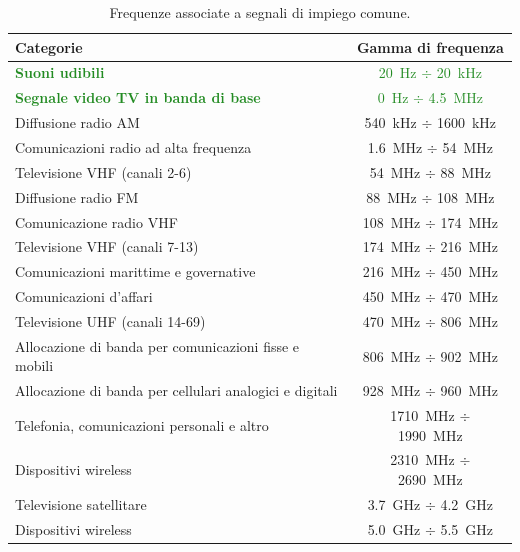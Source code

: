 \documentclass[openany,a4paper,12pt]{book}
\begin{document}
\begin{table}[H]
    \centering
    \small
    \renewcommand{\arraystretch}{1.1}
    \begin{tabular}{lc}
        \toprule
        \textbf{Categorie} & \textbf{Gamma di frequenza} \\
        \midrule
        \rowcolor{ForestGreen!10} \textcolor{ForestGreen}{\textbf{Suoni udibili}} & \textcolor{ForestGreen}{\qty{20}{\hertz} $\div$ \qty{20}{\kilo\hertz}} \\
        \rowcolor{ForestGreen!10} \textcolor{ForestGreen}{\textbf{Segnale video TV in banda di base}} & \textcolor{ForestGreen}{\qty{0}{\hertz} $\div$ \qty{4.5}{\mega\hertz}} \\
        Diffusione radio AM & \qty{540}{\kilo\hertz} $\div$ \qty{1600}{\kilo\hertz} \\
        Comunicazioni radio ad alta frequenza & \qty{1.6}{\mega\hertz} $\div$ \qty{54}{\mega\hertz} \\
        Televisione VHF (canali 2-6) & \qty{54}{\mega\hertz} $\div$ \qty{88}{\mega\hertz} \\
        \midrule
        Diffusione radio FM & \qty{88}{\mega\hertz} $\div$ \qty{108}{\mega\hertz} \\
        Comunicazione radio VHF & \qty{108}{\mega\hertz} $\div$ \qty{174}{\mega\hertz} \\
        Televisione VHF (canali 7-13) & \qty{174}{\mega\hertz} $\div$ \qty{216}{\mega\hertz} \\
        \midrule
        Comunicazioni marittime e governative & \qty{216}{\mega\hertz} $\div$ \qty{450}{\mega\hertz} \\
        Comunicazioni d'affari & \qty{450}{\mega\hertz} $\div$ \qty{470}{\mega\hertz} \\
        Televisione UHF (canali 14-69) & \qty{470}{\mega\hertz} $\div$ \qty{806}{\mega\hertz} \\
        Allocazione di banda per comunicazioni fisse e mobili & \qty{806}{\mega\hertz} $\div$ \qty{902}{\mega\hertz} \\
        Allocazione di banda per cellulari analogici e digitali & \qty{928}{\mega\hertz} $\div$ \qty{960}{\mega\hertz} \\
        Telefonia, comunicazioni personali e altro & \qty{1710}{\mega\hertz} $\div$ \qty{1990}{\mega\hertz} \\
        Dispositivi wireless & \qty{2310}{\mega\hertz} $\div$ \qty{2690}{\mega\hertz} \\
        Televisione satellitare & \qty{3.7}{\giga\hertz} $\div$ \qty{4.2}{\giga\hertz} \\
        Dispositivi wireless & \qty{5.0}{\giga\hertz} $\div$ \qty{5.5}{\giga\hertz} \\
        \bottomrule
    \end{tabular}
    \caption*{Frequenze associate a segnali di impiego comune.}
\end{table}
\end{document}
